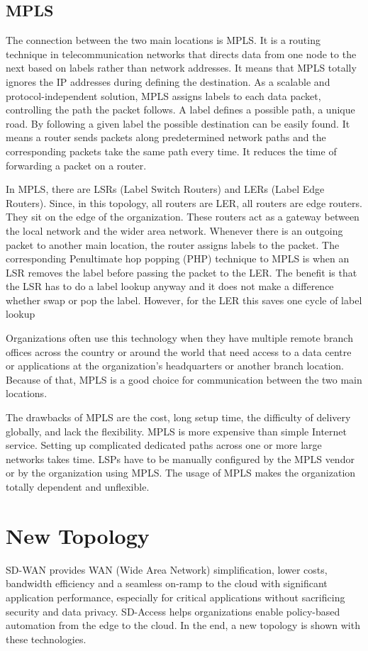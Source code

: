 \documentclass{article}
\begin{document}
\subsection{MPLS}
The connection between the two main locations is MPLS. It is a routing technique in telecommunication networks that directs data from one node to the next based on labels rather than network addresses. It means that MPLS totally ignores the IP addresses during defining the destination. As a scalable and protocol-independent solution, MPLS assigns labels to each data packet, controlling the path the packet follows. A label defines a possible path, a unique road. By following a given label the possible destination can be easily found. It means a router sends packets along predetermined network paths and the corresponding packets take the same path every time. It reduces the time of forwarding a packet on a router. 

In MPLS, there are LSRs (Label Switch Routers) and LERs (Label Edge Routers). Since, in this topology, all routers are LER, all routers are edge routers. They sit on the edge of the organization. These routers act as a gateway between the local network and the wider area network. Whenever there is an outgoing packet to another main location, the router assigns labels to the packet. The corresponding Penultimate hop popping (PHP) technique to MPLS is when an LSR removes the label before passing the packet to the LER. The benefit is that the LSR has to do a label lookup anyway and it does not make a difference whether swap or pop the label. However, for the LER this saves one cycle of label lookup

Organizations often use this technology when they have multiple remote branch offices across the country or around the world that need access to a data centre or applications at the organization’s headquarters or another branch location. Because of that, MPLS is a good choice for communication between the two main locations.

The drawbacks of MPLS are the cost, long setup time, the difficulty of delivery globally, and lack the flexibility. MPLS is more expensive than simple Internet service. Setting up complicated dedicated paths across one or more large networks takes time. LSPs have to be manually configured by the MPLS vendor or by the organization using MPLS. The usage of MPLS makes the organization totally dependent and unflexible.

\section{New Topology}
SD-WAN provides WAN (Wide Area Network) simplification, lower costs, bandwidth efficiency and a seamless on-ramp to the cloud with significant application performance, especially for critical applications without sacrificing security and data privacy\cite{SDN_wan}. SD-Access helps organizations enable policy-based automation from the edge to the cloud. In the end, a new topology is shown with these technologies.
\end{document}
